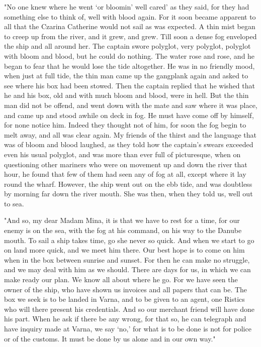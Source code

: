 "No one knew where he went `or bloomin' well cared' as they said, for they had something else to think of, well with blood again. For it soon became apparent to all that the Czarina Catherine would not sail as was expected. A thin mist began to creep up from the river, and it grew, and grew. Till soon a dense fog enveloped the ship and all around her. The captain swore polyglot, very polyglot, polyglot with bloom and blood, but he could do nothing. The water rose and rose, and he began to fear that he would lose the tide altogether. He was in no friendly mood, when just at full tide, the thin man came up the gangplank again and asked to see where his box had been stowed. Then the captain replied that he wished that he and his box, old and with much bloom and blood, were in hell. But the thin man did not be offend, and went down with the mate and saw where it was place, and came up and stood awhile on deck in fog. He must have come off by himself, for none notice him. Indeed they thought not of him, for soon the fog begin to melt away, and all was clear again. My friends of the thirst and the language that was of bloom and blood laughed, as they told how the captain's swears exceeded even his usual polyglot, and was more than ever full of picturesque, when on questioning other mariners who were on movement up and down the river that hour, he found that few of them had seen any of fog at all, except where it lay round the wharf. However, the ship went out on the ebb tide, and was doubtless by morning far down the river mouth. She was then, when they told us, well out to sea. 

"And so, my dear Madam Mina, it is that we have to rest for a time, for our enemy is on the sea, with the fog at his command, on his way to the Danube mouth. To sail a ship takes time, go she never so quick. And when we start to go on land more quick, and we meet him there. Our best hope is to come on him when in the box between sunrise and sunset. For then he can make no struggle, and we may deal with him as we should. There are days for us, in which we can make ready our plan. We know all about where he go. For we have seen the owner of the ship, who have shown us invoices and all papers that can be. The box we seek is to be landed in Varna, and to be given to an agent, one Ristics who will there present his credentials. And so our merchant friend will have done his part. When he ask if there be any wrong, for that so, he can telegraph and have inquiry made at Varna, we say `no,' for what is to be done is not for police or of the customs. It must be done by us alone and in our own way." 


